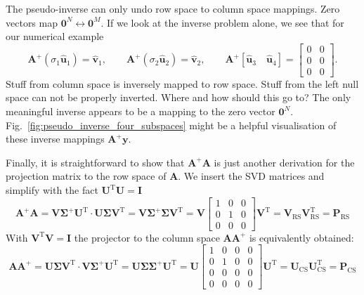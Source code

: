 \documentclass[a4paper, 11pt]{scrartcl}
\begin{document}
The pseudo-inverse can only undo row space to column space mappings. Zero vectors map  $\bm{0}^N \leftrightarrow \bm{0}^M$.
%
If we look at the inverse problem alone, we see that for our numerical example
$$
\bm{A}^+ (\sigma_1 \hat{\bm{u}}_1) = \hat{\bm{v}}_1,\qquad
%
\bm{A}^+ (\sigma_2 \hat{\bm{u}}_2) = \hat{\bm{v}}_2,\qquad
%
\bm{A}^+ [\hat{\bm{u}}_3 \quad \hat{\bm{u}}_4] =
\begin{bmatrix}
0&0\\0&0\\0&0
\end{bmatrix}.
$$
Stuff from column space is inversely mapped to row space. Stuff from the left null space can not be properly inverted. Where and how should this go to? The only meaningful inverse appears to be a mapping to the zero vector $\bm{0}^N$.
Fig.~\ref{fig:pseudo_inverse_four_subspaces} might be a helpful visualisation of these inverse mappings $\bm{A}^+ \bm{y}$.

Finally, it is straightforward to show that $\bm{A}^+ \bm{A}$ is just another derivation for the projection matrix to the row space of $\bm{A}$. We insert the SVD matrices and simplify with the fact $\bm{U}^\mathrm{T} \bm{U}=\bm{I}$
$$
\bm{A}^+ \bm{A} =
\bm{V} \bm{\Sigma}^+ \bm{U}^\mathrm{T} \cdot
\bm{U} \bm{\Sigma} \bm{V}^\mathrm{T}
=
\bm{V} \bm{\Sigma}^+ \bm{\Sigma} \bm{V}^\mathrm{T}
=
\bm{V}
\begin{bmatrix}
1 & 0 & 0\\
0 & 1 & 0\\
0 & 0 & 0
\end{bmatrix}
\bm{V}^\mathrm{T}
=
\bm{V}_\text{RS} \bm{V}_\text{RS}^\mathrm{T}
=\bm{P}_\text{RS}
$$
With $\bm{V}^\mathrm{T} \bm{V}=\bm{I}$ the projector to the column space $\bm{A} \bm{A}^+$ is equivalently obtained:
$$
\bm{A} \bm{A}^+ =
\bm{U} \bm{\Sigma} \bm{V}^\mathrm{T} \cdot
\bm{V} \bm{\Sigma}^+ \bm{U}^\mathrm{T}
=
\bm{U} \bm{\Sigma} \bm{\Sigma}^+ \bm{U}^\mathrm{T}
=
\bm{U}
\begin{bmatrix}
1 & 0 & 0 & 0\\
0 & 1 & 0 & 0\\
0 & 0 & 0 & 0\\
0 & 0 & 0 & 0
\end{bmatrix}
\bm{U}^\mathrm{T}
=
\bm{U}_\text{CS} \bm{U}_\text{CS}^\mathrm{T}
=\bm{P}_\text{CS}
$$
\end{document}
